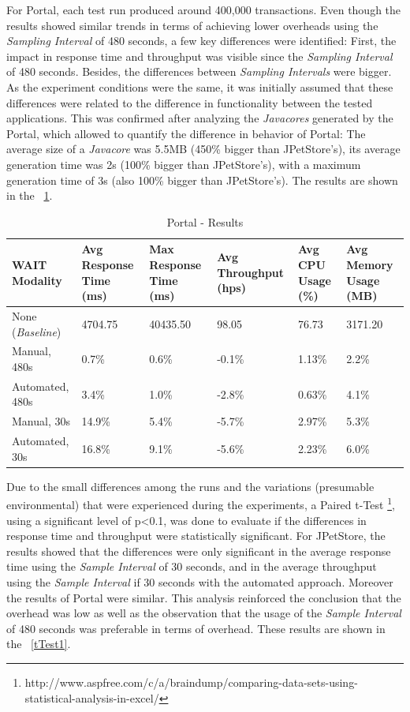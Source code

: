 \documentclass[runningheads,a4paper]{llncs}
\begin{document}
For Portal, each test run produced around 400,000 transactions. Even
though the results showed similar trends in terms of achieving lower overheads using the \emph{Sampling Interval}
of 480 seconds, a few key differences were identified: First, the impact in
response time and throughput was visible since the \emph{Sampling Interval} of
480 seconds. Besides, the differences between \emph{Sampling Intervals} were
bigger. As the experiment conditions were the same, it was initially assumed
that these differences were related to the difference in functionality between
the tested applications. This was confirmed after analyzing the \emph{Javacores}
generated by the Portal, which allowed to quantify the difference in behavior of
Portal: The average size of a \emph{Javacore} was 5.5MB (450\% bigger than JPetStore's), its average
generation time was 2s (100\% bigger than JPetStore's), with a maximum
generation time of 3s (also 100\% bigger than JPetStore's). The results are
shown in the \tablename ~\ref{Portal1}.

\begin{table}[!h]
\caption{Portal - Results}
\label{Portal1}
\centering
\begin{tabular}{p{}|p{}|p{}|p{}|p{}|p{}}
\hline
\bfseries WAIT Modality & \bfseries Avg Response Time (ms)& \bfseries Max
Response Time (ms)& \bfseries Avg Throughput (hps)& \bfseries Avg CPU Usage
(\%) & \bfseries Avg Memory Usage (MB)\\
\hline
None (\emph{Baseline}) 	& 4704.75	& 40435.50	& 98.05 	& 76.73 	& 3171.20\\
Manual, 480s 			& 0.7\% 	& 0.6\%		& -0.1\%	& 1.13\% 	& 2.2\%\\
Automated, 480s 		& 3.4\%		& 1.0\%		& -2.8\% 	& 0.63\% 	& 4.1\%\\
Manual, 30s 			& 14.9\%	& 5.4\%		& -5.7\% 	& 2.97\% 	& 5.3\%\\
Automated, 30s 			& 16.8\%	& 9.1\%		& -5.6\% 	& 2.23\% 	& 6.0\%\\
\hline
\end{tabular}
\end{table}

Due to the small differences among the runs and the variations (presumable
environmental) that were experienced during the experiments, a Paired t-Test
\footnote{http://www.aspfree.com/c/a/braindump/comparing-data-sets-using-statistical-analysis-in-excel/},
using a significant level of p<0.1, was done to evaluate if the differences in
response time and throughput were statistically significant. For JPetStore, the
results showed that the differences were only significant in the average
response time using the \emph{Sample Interval} of 30 seconds, and in the
average throughput using the \emph{Sample Interval} if 30 seconds with the
automated approach. Moreover the results of Portal were similar. This analysis
reinforced the conclusion that the overhead was low as well as the observation
that the usage of the \emph{Sample Interval} of 480 seconds was preferable in
terms of overhead. These results are shown in the \tablename ~\ref{tTest1}.
\end{document}
